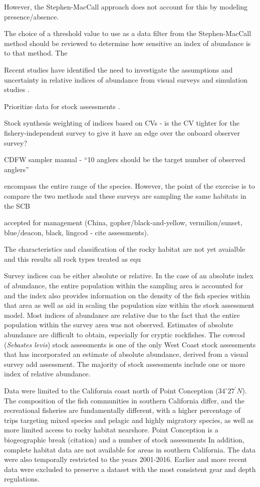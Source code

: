 \documentclass[
  authoryear,
  preprint,
  3p]{elsarticle}
\begin{document}
However, the Stephen-MacCall approach does not account for this by
modeling presence/absence.

The choice of a threshold value to use as a data filter from the
Stephen-MacCall method should be reviewed to determine how sensitive an
index of abundance is to that method. The

Recent studies have identified the need to investigate the assumptions
and uncertainty in relative indices of abundance from visual surveys
\citep{Bacheler:2015:ERA, Campbell:2015:CRA} and simulation studies
\citep{Siegfried:2016:ISA}.

Prioritize data for stock assessments \citep{Magnusson:2007:WMF}.

Stock synthesis weighting of indices based on CVs - is the CV tighter
for the fishery-independent survey to give it have an edge over the
onboard observer survey?

CDFW sampler manual - ``10 anglers should be the target number of
observed anglers''

encompass the entire range of the species. However, the point of the
exercise is to compare the two methods and these surveys are sampling
the same habitats in the SCB

accepted for management (China, gopher/black-and-yellow,
vermilion/sunset, blue/deacon, black, lingcod - cite assessments).

The characteristics and classification of the rocky habitat are not yet
avaialble and this results all rock types treated as equ

Survey indices can be either absolute or relative. In the case of an
absolute index of abundance, the entire population within the sampling
area is accounted for and the index also provides information on the
density of the fish species within that area as well as aid in scaling
the population size within the stock assessment model. Most indices of
abundance are relative due to the fact that the entire population within
the survey area was not observed. Estimates of absolute abundance are
difficult to obtain, especially for cryptic rockfishes. The cowcod
(\emph{Sebastes levis}) stock assessments is one of the only West Coast
stock assessments that has incorporated an estimate of absolute
abundance, derived from a visual survey \citep{Love:2009:DFA} add
assessment. The majority of stock assessments include one or more index
of relative abundance.

Data were limited to the California coast north of Point Conception
(\(34^\circ 27^\prime N\)). The composition of the fish communities in
southern California differ, and the recreational fisheries are
fundamentally different, with a higher percentage of trips targeting
mixed species and pelagic and highly migratory species, as well as more
limited access to rocky habitat nearshore. Point Conception is a
biogeographic break (citation) and a number of stock assessments In
addition, complete habitat data are not available for areas in southern
California. The data were also temporally restricted to the years
2001-2016. Earlier and more recent data were excluded to preserve a
dataset with the most consistent gear and depth regulations.
\end{document}
